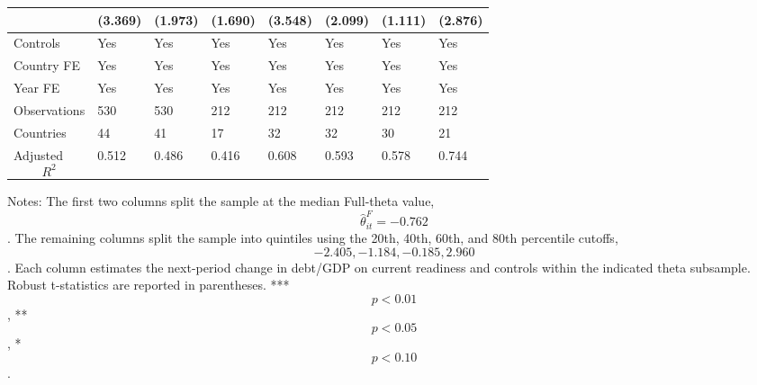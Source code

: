 \begin{table}[H]
\begin{threeparttable}
\begin{tabularx}{\textwidth}{lYYYYYYY}
  & (3.369) & (1.973) & (1.690) & (3.548) & (2.099) & (1.111) & (2.876) \\
\midrule
Controls & Yes & Yes & Yes & Yes & Yes & Yes & Yes \\
Country FE & Yes & Yes & Yes & Yes & Yes & Yes & Yes \\
Year FE & Yes & Yes & Yes & Yes & Yes & Yes & Yes \\
Observations & 530 & 530 & 212 & 212 & 212 & 212 & 212 \\
Countries & 44 & 41 & 17 & 32 & 32 & 30 & 21 \\
Adjusted $$R^2$$ & 0.512 & 0.486 & 0.416 & 0.608 & 0.593 & 0.578 & 0.744 \\
\bottomrule
\end{tabularx}
\begin{tablenotes}[flushleft]\footnotesize
\item Notes: The first two columns split the sample at the median Full-theta value, $$\widehat{\theta}^{F}_{it}=-0.762$$. The remaining columns split the sample into quintiles using the 20th, 40th, 60th, and 80th percentile cutoffs, $$-2.405, -1.184, -0.185, 2.960$$. Each column estimates the next-period change in debt/GDP on current readiness and controls within the indicated theta subsample. Robust t-statistics are reported in parentheses. *** $$p<0.01$$, ** $$p<0.05$$, * $$p<0.10$$.
\end{tablenotes}
\end{threeparttable}
\end{table}
